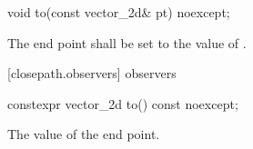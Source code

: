 \begin{itemdecl}
void to(const vector_2d& pt) noexcept;
\end{itemdecl}
\begin{itemdescr}
\pnum
\effects
The end point shall be set to the value of .
\end{itemdescr}

 [closepath.observers]{ observers}

\begin{itemdecl}
constexpr vector_2d to() const noexcept;
\end{itemdecl}
\begin{itemdescr}
\pnum
\returns
The value of the end point.
\end{itemdescr}
